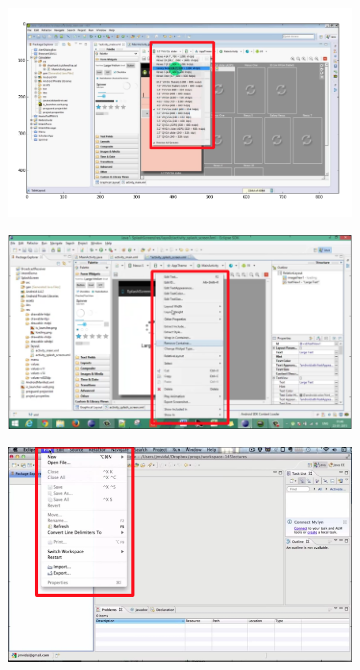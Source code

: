 \documentclass[10pt]{article}
\begin{document}
\begin{figure}
    \centering
    \begin{subfigure}{0.15\textwidth}
        \includegraphics[width=\textwidth]{fig/proposal1}
        \caption{}
        \label{fig:proposal1}
        \vspace*{2mm}
    \end{subfigure}
    \begin{subfigure}{0.15\textwidth}
        \includegraphics[width=\textwidth]{fig/proposal2}
        \caption{}
        \label{fig:proposal2}
        \vspace*{2mm}
    \end{subfigure}
    \begin{subfigure}{0.15\textwidth}
        \includegraphics[width=\textwidth]{fig/proposal3}

\end{subfigure}
\end{figure}
\end{document}
